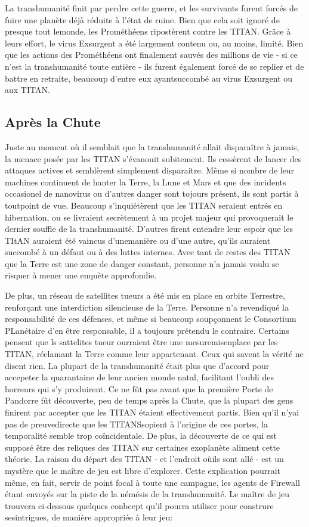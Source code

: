 La transhumanité finit par perdre cette guerre, et les survivants furent forcés de fuire une planète déjà réduite à l'état de ruine. Bien que cela soit ignoré de presque tout lemonde, les Prométhéens ripostèrent contre les TITAN. Grâce à leurs effort, le virus Exsurgent a été largement contenu ou, au moins, limité. Bien que les actions des Prométhéens ont finalement sauvés des millions de vie - si ce n'est la transhumanité toute entière - ils furent également forcé de se replier et de battre en retraite, beaucoup d'entre eux ayantsuccombé au virus Exsurgent ou aux TITAN. 

\subsection{Après la Chute} 

Juste au moment où il semblait que la transhumanité allait disparaître à jamais, la menace posée par les TITAN s'évanouit subitement. Ils cessèrent de lancer des attaques actives et semblèrent simplement disparaitre. Même si nombre de leur machines continuent de hanter la Terre, la Lune et Mars et que des incidents occasionel de nanovirus ou d'autres danger sont tojours présent, ils sont partis à toutpoint de vue. Beaucoup s'inquiétèrent que les TITAN seraient entrés en hibernation, ou se livraient secrètement à un projet majeur qui provoquerait le dernier souffle de la transhumanité. D'autres firent entendre leur espoir que les TItAN auraient été vaincus d'unemanière ou d'une autre, qu'ils auraient succombé à un défaut ou à des luttes internes. Avec tant de restes des TITAN que la Terre est une zone de danger constant, personne n'a jamais voulu se risquer à mener une enquète approfondie. 

De plus, un réseau de satellites tueurs a été mis en place en orbite Terrestre, renforçant une interdiction silencieuse de la Terre. Personne n'a revendiqué la responsabilité de ces défenses, et même si beaucoup soupçonnent le Consortium PLanétaire d'en être responsable, il a toujours prétendu le contraire. Certains pensent que ls sattelites tueur ourraient être une mesuremisenplace par les TITAN, réclamant la Terre comme leur appartenant. Ceux qui savent la vérité ne disent rien. La plupart de la transhumanité était plus que d'accord pour accepeter la quarantaine de leur ancien monde natal, facilitant l'oubli des horreurs qui s'y produirent. Ce ne fût pas avant que la première Porte de Pandorre fût découverte, peu de temps après la Chute, que la plupart des gens finirent par accepter que les TITAN étaient effectivement partis. Bien qu'il n'yai pas de preuvedirecte que les TITANSsopient à l'origine de ces portes, la temporalité semble trop coïncidentale. De plus, la découverte de ce qui est supposé être des reliques des TITAN sur certaines exoplanète aliment cette théorie. La raison du départ des TITAN - et l'endroit oùils sont allé - est un mystère que le maître de jeu est libre d'explorer. Cette explication pourrait même, en fait, servir de point focal à toute une campagne, les agents de Firewall étant envoyés sur la piste de la némésis de la transhumanité. Le maître de jeu trouvera ci-dessous quelques conbcept qu'il pourra utiliser pour construre sesintrigues, de manière appropriée à leur jeu: 

